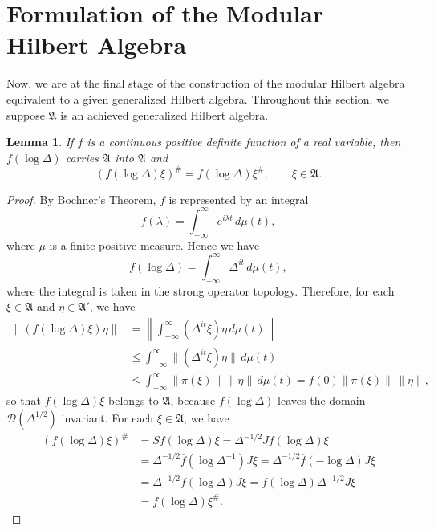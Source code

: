 \documentclass[12pt,b5paper,twoside]{article}
\theoremstyle{takesaki}
\newtheorem{lemma}{Lemma}[section]
\numberwithin{equation}{section}
\begin{document}
\section{Formulation of the Modular Hilbert Algebra}\label{sec:10}

Now, we are at the final stage of the construction of the modular
Hilbert algebra equivalent to a given generalized Hilbert algebra.
Throughout this section, we suppose $\mathfrak A$ is an achieved
generalized Hilbert algebra.

\begin{lemma}\label{lem:10.1}
If $f$ is a continuous positive definite function of a real variable,
then $f(\log\Delta)$ carries $\mathfrak A$ into $\mathfrak A$ and
\begin{equation}
 (f(\log\Delta)\xi)^{\#}=f(\log\Delta)\xi^{\#},
 \qquad \xi\in\mathfrak A.
 \tag{10.1}\label{eq:10.1}
\end{equation}
\end{lemma}

\begin{proof}
By Bochner's Theorem, $f$ is represented by an integral
\[
  f(\lambda)=\int_{-\infty}^{\infty}e^{i\lambda t}\,d\mu(t),
\]
where $\mu$ is a finite positive measure.  Hence we have
\[
  f(\log\Delta)=\int_{-\infty}^{\infty}\Delta^{it}\,d\mu(t),
\]
where the integral is taken in the strong operator topology.
Therefore, for each $\xi\in\mathfrak A$ and
$\eta\in\mathfrak A'$, we have
\begin{align*}
 \|(f(\log\Delta)\xi)\eta\|
 &=\left\|\int_{-\infty}^{\infty}(\Delta^{it}\xi)\eta\,d\mu(t)\right\|\\
 &\leq\int_{-\infty}^{\infty}\|(\Delta^{it}\xi)\eta\|\,d\mu(t)\\
 &\leq\int_{-\infty}^{\infty}\|\pi(\xi)\|\,\|\eta\|\,d\mu(t)
 =f(0)\|\pi(\xi)\|\,\|\eta\|,
\end{align*}
so that $f(\log\Delta)\xi$ belongs to $\mathfrak A$, because
$f(\log\Delta)$ leaves the domain $\mathcal D(\Delta^{1/2})$
invariant.  For each $\xi\in\mathfrak A$, we have
\begin{align*}
 (f(\log\Delta)\xi)^{\#}
 &=Sf(\log\Delta)\xi
 =\Delta^{-1/2}Jf(\log\Delta)\xi\\
 &=\Delta^{-1/2}\overline f(\log\Delta^{-1})J\xi
 =\Delta^{-1/2}\overline f(-\log\Delta)J\xi\\
 &=\Delta^{-1/2}f(\log\Delta)J\xi
 =f(\log\Delta)\Delta^{-1/2}J\xi\\
 &=f(\log\Delta)\xi^{\#}.
\end{align*}
\end{proof}
\end{document}
